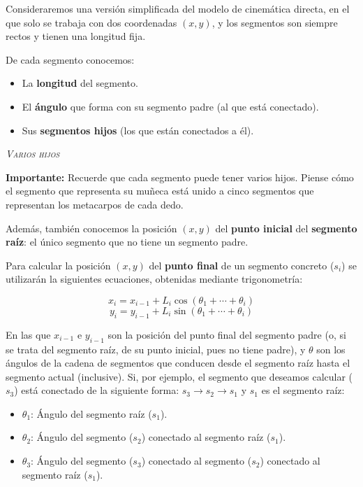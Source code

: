 \documentclass[10pt,a4paper,spanish]{article}
\newcommand{\sombreado}[2]{
  \begin{shaded}
    \begin{center} \emph{\textsc{#1}} \end{center}
    \noindent #2\\
  \end{shaded}
}
\begin{document}
Consideraremos una versión simplificada del modelo de cinemática directa, en el que solo se trabaja con dos coordenadas $(x, y)$, y los segmentos son siempre rectos y tienen una longitud fija.

De cada segmento conocemos:

\begin{itemize}
    \item La \textbf{longitud} del segmento.
    \item El \textbf{ángulo} que forma con su segmento padre (al que está conectado).
    \item Sus \textbf{segmentos hijos} (los que están conectados a él).
\end{itemize}

\sombreado{Varios hijos}{\textbf{Importante:} Recuerde que cada segmento puede tener varios hijos. Piense cómo el segmento que representa su muñeca está unido a cinco segmentos que representan los metacarpos de cada dedo.}

Además, también conocemos la posición $(x,y)$ del \textbf{punto inicial} del \textbf{segmento raíz}: el único segmento que no tiene un segmento padre.

Para calcular la posición $(x,y)$ del \textbf{punto final} de un segmento concreto ($s_i$) se utilizarán la siguientes ecuaciones, obtenidas mediante trigonometría:

$$x_i = x_{i-1} + L_i \cos{(\theta_1 + \cdots + \theta_i)} $$
$$y_i = y_{i-1} + L_i \sin{(\theta_1 + \cdots + \theta_i)} $$

En las que $x_{i-1}$ e $y_{i-1}$ son la posición del punto final del segmento padre (o, si se trata del segmento raíz, de su punto inicial, pues no tiene padre), y $\theta$ son los ángulos de la cadena de segmentos que conducen desde el segmento raíz hasta el segmento actual (inclusive). Si, por ejemplo, el segmento que deseamos calcular ($s_3$) está conectado de la siguiente forma: $s_3 \to s_2 \to s_1$ y $s_1$ es el segmento raíz:

\begin{itemize}
    \item $\theta_1$: Ángulo del segmento raíz ($s_1$).
    \item $\theta_2$: Ángulo del segmento ($s_2$) conectado al segmento raíz ($s_1$).
    \item $\theta_3$: Ángulo del segmento ($s_3$) conectado al segmento ($s_2$) conectado al segmento raíz ($s_1$).
\end{itemize}
\end{document}
